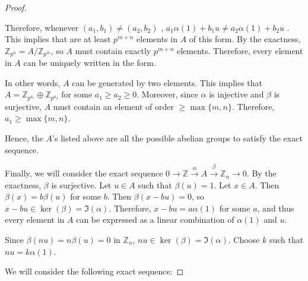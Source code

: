 \documentclass[12pt, psamsfonts]{amsart}
\theoremstyle{definition}
\theoremstyle{remark}
\numberwithin{equation}{section}
\begin{document}
\begin{proof}
\begin{itemize}
      Therefore, whenever $(a_1, b_1) \ne (a_2, b_2)$ , $a_1\alpha(1) + b_1u \ne a_2\alpha(1) + b_2u$ .
      This implies that are at least $p^{m + n}$ elements in $A$ of this form.
      By the exactness, $\mathbb{Z}_{p^n} = A / \mathbb{Z}_{p^m}$, so $A$ must contain exactly $p^{m + n}$ elements.
      Therefore, every element in $A$ can be uniquely written in the form.

      In other words, $A$ can be generated by two elements.
      This implies that $A = \mathbb{Z}_{p^{a_1}} \oplus \mathbb{Z}_{p^{a_2}}$ for some $a_1 \geq a_2 \geq 0$.
      Moreover, since $\alpha$ is injective and $\beta$ is surjective, $A$ must contain an element of order $\geq \max\{ m, n \}$.
      Therefore, $a_1 \geq \max\{ m, n \}$.
  \end{itemize}
  Hence, the $A$'s listed above are all the possible abelian groups to satisfy the exact sequence.

  Finally, we will consider the exact sequence $0 \rightarrow \mathbb{Z} \xrightarrow{\alpha} A \xrightarrow{\beta} \mathbb{Z}_n \rightarrow 0$.
  By the exactness, $\beta$ is surjective.
  Let $u \in A$ such that $\beta(u) = 1$.
  Let $x \in A$.
  Then $\beta(x) = b\beta(u)$ for some $b$.
  Then $\beta(x - bu) = 0$, so $x - bu \in \ker(\beta) = \Im(\alpha)$.
  Therefore, $x - bu = a\alpha(1)$ for some $a$, and thus every element in $A$ can be expressed as a linear combination of $\alpha(1)$ and $u$.

  Since $\beta(nu) = n\beta(u) = 0$ in $\mathbb{Z}_n$, $nu \in \ker(\beta) = \Im(\alpha)$.
  Choose $k$ such that $nu = k\alpha(1)$.

  We will consider the following exact sequence:


\end{proof}
\end{document}
